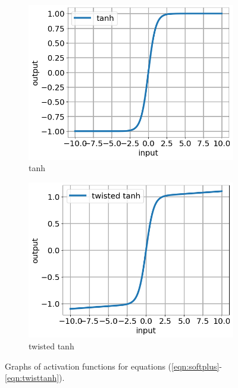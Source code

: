 \documentclass[12pt]{article}
\begin{document}
\begin{figure}[h]
\begin{subfigure}[c]{5.5cm}
    \includegraphics[totalheight=4cm]{Figures/scripts/tanh.png}
    \caption{tanh}
  \end{subfigure}
  \begin{subfigure}[c]{5.5cm}
    \includegraphics[totalheight=4cm]{Figures/scripts/twistedtanh.png}
    \caption{twisted tanh}
  \end{subfigure}
\caption{\label{fig:activations} Graphs of activation functions for equations (\ref{eqn:softplus}-\ref{eqn:twisttanh}).}
\end{figure}
\end{document}
